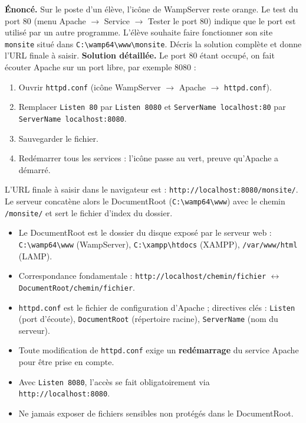 \documentclass[11pt]{article}
\newcommand{\cle}[1]{{\popxbold\color{popdark}#1}}
\begin{document}
\begin{exoresolu}
\textbf{Énoncé.} Sur le poste d'un élève, l'icône de WampServer reste orange. Le test du port 80 (menu Apache $\rightarrow$ Service $\rightarrow$ Tester le port 80) indique que le port est utilisé par un autre programme. L'élève souhaite faire fonctionner son site \texttt{monsite} situé dans \texttt{C:\textbackslash wamp64\textbackslash www\textbackslash monsite}. Décris la solution complète et donne l'URL finale à saisir.
\tcblower
\textbf{Solution détaillée.} Le port 80 étant occupé, on fait écouter Apache sur un port libre, par exemple 8080 :
\begin{enumerate}
  \item Ouvrir \texttt{httpd.conf} (icône WampServer $\rightarrow$ Apache $\rightarrow$ \texttt{httpd.conf}).
  \item Remplacer \texttt{Listen 80} par \texttt{Listen 8080} et \texttt{ServerName localhost:80} par \texttt{ServerName localhost:8080}.
  \item Sauvegarder le fichier.
  \item Redémarrer tous les services : l'icône passe au vert, preuve qu'Apache a démarré.
\end{enumerate}
L'URL finale à saisir dans le navigateur est : \texttt{http://localhost:8080/monsite/}. Le serveur concatène alors le DocumentRoot (\texttt{C:\textbackslash wamp64\textbackslash www}) avec le chemin \texttt{/monsite/} et sert le fichier d'index du dossier.
\end{exoresolu}

\begin{aretenir}
\begin{itemize}
  \item Le \cle{DocumentRoot} est le dossier du disque exposé par le serveur web : \texttt{C:\textbackslash wamp64\textbackslash www} (WampServer), \texttt{C:\textbackslash xampp\textbackslash htdocs} (XAMPP), \texttt{/var/www/html} (LAMP).
  \item Correspondance fondamentale : \texttt{http://localhost/chemin/fichier} $\leftrightarrow$ \texttt{DocumentRoot/chemin/fichier}.
  \item \texttt{httpd.conf} est le fichier de configuration d'Apache ; directives clés : \texttt{Listen} (port d'écoute), \texttt{DocumentRoot} (répertoire racine), \texttt{ServerName} (nom du serveur).
  \item Toute modification de \texttt{httpd.conf} exige un \textbf{redémarrage} du service Apache pour être prise en compte.
  \item Avec \texttt{Listen 8080}, l'accès se fait obligatoirement via \texttt{http://localhost:8080}.
  \item Ne jamais exposer de fichiers sensibles non protégés dans le DocumentRoot.
\end{itemize}
\end{aretenir}
\end{document}
